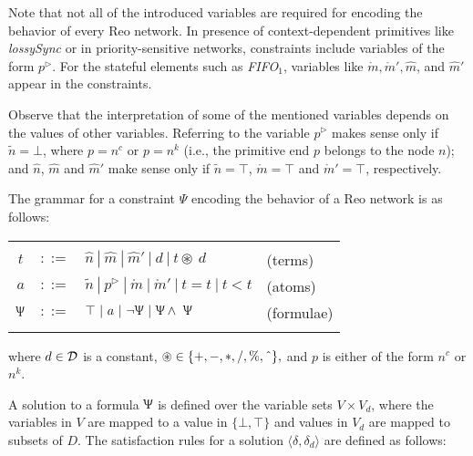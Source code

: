 Note that not all of the introduced variables are required for encoding the behavior of every Reo network. In presence of context-dependent primitives like \emph{lossySync} or in priority-sensitive networks, constraints include variables of the form $p^\triangleright$. For the stateful elements such as \emph{FIFO$_1$}, variables like $\mathring{m}, \mathring{m}', \hat{m}$, and $\hat{m}'$ appear in the constraints.

Observe that the interpretation of some of the mentioned variables depends on the values of other variables. Referring to the variable $p^\triangleright$ makes sense only if $\tilde{n} = \bot$, where $p = n^c$ or $p=n^k$ (i.e., the primitive end $p$ belongs to the node $n$); and $\hat{n}$, $\hat{m}$ and $\hat{m}'$ make sense only if  $\tilde{n} = \top$, $\mathring{m} = \top$ and $\mathring{m}' = \top$, respectively.

The grammar for a constraint $\Psi$ encoding the behavior of a Reo network is as follows:

\begin{tabular}{c c l l}
\centering
  & \\
  $t $&$::= $&$\hat{n}\ |\ \hat{m}\ |\ \hat{m}'\ |\ d\ |\ t \circledast \ d$ & (terms)\\
  $a $&$::=$&$ \tilde{n}\ |\ p^\triangleright\ |\ \mathring{m}\ |\ \mathring{m}'\ |\ t=t\ |\ t<t $ & (atoms)\\
  $\Uppsi $&$::=$&$ \top \ | \ a\ |\ \neg \Uppsi \ | \ \Uppsi \wedge \ \Uppsi $ & (formulae)\\  
  &
\end{tabular} 

\noindent
where $d \in \mathcal{D}$ is a constant, $\circledast \in \{+, -, \ast, /, \%, \tavan \}, $ and $p$ is  either of the form $n^c$ or $n^k$.

A solution to a formula $\Uppsi$ is defined over the variable sets $V \times V_d$, where the variables in $V$ are mapped to a value in $\{\bot, \top\}$ and values in $V_d$ are mapped to subsets of $D$. The satisfaction rules for a solution $\langle \delta, \delta_d \rangle$ are defined as follows:


